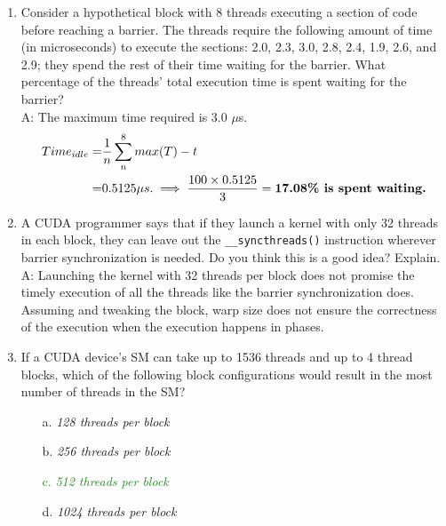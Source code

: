 \begin{enumerate}
\begin{enumerate}
              \item Consider a hypothetical block with 8 threads executing a section of code before reaching a barrier. The threads require the following amount of time (in microseconds) to execute the sections: 2.0, 2.3, 3.0, 2.8, 2.4, 1.9, 2.6, and
                    2.9; they spend the rest of their time waiting for the barrier. What percentage of the threads' total execution time is spent waiting for the barrier?
                    \\A: The maximum time required is 3.0 \(\mu\)s.\\
                    \begin{equation*}
                        \begin{aligned}
                            Time_{idle} = & \frac{1}{n}\sum_{n}^{8} max(T) - t                                                             \\
                            =             & 0.5125 \mu s. \implies \frac{100 \times 0.5125}{3} = \text{\textbf{17.08\% is spent waiting.}}
                        \end{aligned}
                    \end{equation*}
              \item A CUDA programmer says that if they launch a kernel with only 32 threads in each block, they can leave out the \texttt{\_\_syncthreads()} instruction wherever barrier synchronization is needed. Do you think this is a good idea? Explain.
                    \\A: Launching the kernel with 32 threads per block does not promise the timely execution of all the threads like the barrier synchronization does. Assuming and tweaking the block, warp size does not ensure the correctness of the execution when the execution happens in phases.
              \item If a CUDA device's SM can take up to 1536 threads and up to 4 thread blocks, which of the following block configurations would result in the most number of threads in the SM?
                    \begin{itemize}
                        \item[a.] \textsl{128 threads per block}
                        \item[b.] \textsl{256 threads per block}
                        \item[\textcolor{ForestGreen}{c.}] \textcolor{ForestGreen}{\textsl{512 threads per block}}
                        \item[d.] \textsl{1024 threads per block}

\end{itemize}
\end{enumerate}
\end{enumerate}
